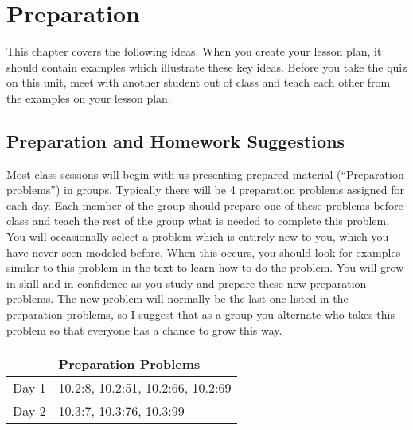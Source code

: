 \section{Preparation}

\noindent
This chapter covers the following ideas. When you create your lesson plan, it should contain examples which illustrate these key ideas. Before you take the quiz on this unit, meet with another student out of class and teach each other from the examples on your lesson plan. 




\subsection{Preparation and Homework Suggestions}

Most class sessions will begin with us presenting prepared material
(``Preparation problems'') in groups.  Typically there will be 4
preparation problems assigned for each day. Each member of the group
should prepare one of these problems before class and teach the rest
of the group what is needed to complete this problem. You will
occasionally select a problem which is entirely new to you, which you
have never seen modeled before. When this occurs, you should look for
examples similar to this problem in the text to learn how to do the
problem. You will grow in skill and in confidence as you study and
prepare these new preparation problems. The new problem will normally
be the last one listed in the preparation problems, so I suggest that
as a group you alternate who takes this problem so that everyone has a
chance to grow this way.


\begin{center}
\begin{tabular}{ll}
&Preparation Problems\\
\hline\hline
Day 1& 10.2:8, 10.2:51, 10.2:66, 10.2:69
\\\hline
Day 2& 10.3:7, 10.3:76, 10.3:99
\\\hline
\end{tabular}
\end{center}

